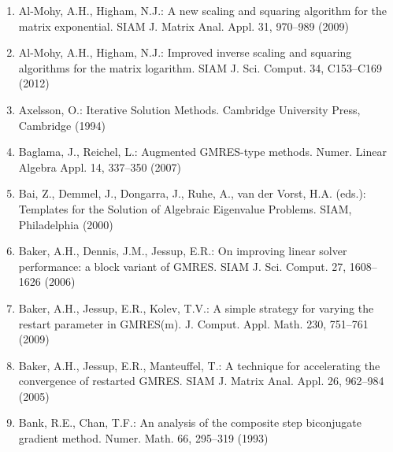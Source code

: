 \begin{enumerate}[label=\arabic*.,ref=\arabic*,leftmargin=3em]
\item\label{bib:source-8}Al-Mohy, A.H., Higham, N.J.: A new scaling and squaring algorithm for the matrix exponential. SIAM J. Matrix Anal. Appl. 31, 970–989 (2009)

\item\label{bib:source-9}Al-Mohy, A.H., Higham, N.J.: Improved inverse scaling and squaring algorithms for the matrix logarithm. SIAM J. Sci. Comput. 34, C153–C169 (2012)

\item\label{bib:source-10}Axelsson, O.: Iterative Solution Methods. Cambridge University Press, Cambridge (1994)

\item\label{bib:source-11}Baglama, J., Reichel, L.: Augmented GMRES-type methods. Numer. Linear Algebra Appl. 14, 337–350 (2007)

\item\label{bib:source-12}Bai, Z., Demmel, J., Dongarra, J., Ruhe, A., van der Vorst, H.A. (eds.): Templates for the Solution of Algebraic Eigenvalue Problems. SIAM, Philadelphia (2000)

\item\label{bib:source-13}Baker, A.H., Dennis, J.M., Jessup, E.R.: On improving linear solver performance: a block variant of GMRES. SIAM J. Sci. Comput. 27, 1608–1626 (2006)

\item\label{bib:source-14}Baker, A.H., Jessup, E.R., Kolev, T.V.: A simple strategy for varying the restart parameter in GMRES(m). J. Comput. Appl. Math. 230, 751–761 (2009)

\item\label{bib:source-15}Baker, A.H., Jessup, E.R., Manteuffel, T.: A technique for accelerating the convergence of restarted GMRES. SIAM J. Matrix Anal. Appl. 26, 962–984 (2005)

\item\label{bib:source-16}Bank, R.E., Chan, T.F.: An analysis of the composite step biconjugate gradient method. Numer. Math. 66, 295–319 (1993)


\end{enumerate}
